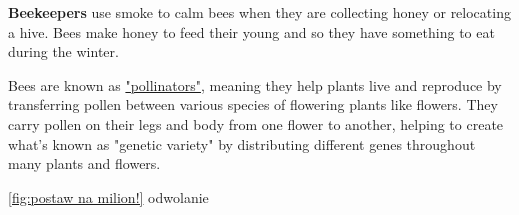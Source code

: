 \textbf{Beekeepers} use smoke to calm bees when they are collecting honey or relocating a hive. Bees make honey to feed their young and so they have something to eat during the winter.\par
Bees are known as \underline{"pollinators"}, meaning they help plants live and reproduce by transferring pollen between various species of flowering plants like flowers. They carry pollen on their legs and body from one flower to another, helping to create what's known as "genetic variety" by distributing different genes throughout many plants and flowers.

 \ref{fig:postaw na milion!}
 odwolanie